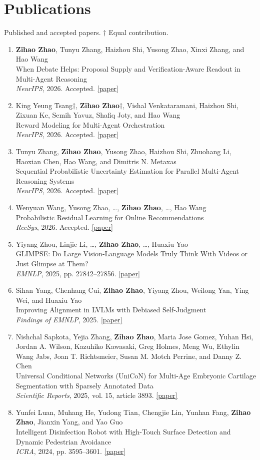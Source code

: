\documentclass[11pt,letterpaper]{article}
\newcommand{\pub}[3]{\item\begin{minipage}[t]{\linewidth}#1\\#2\\#3\end{minipage}}
\begin{document}
\section{Publications}
{\small\color{secondary}Published and accepted papers. $\dagger$ Equal contribution.}\par
\begin{enumerate}
\pub{\textbf{Zihao Zhao}, Tunyu Zhang, Haizhou Shi, Yusong Zhao, Xinxi Zhang, and Hao Wang}{When Debate Helps: Proposal Supply and Verification-Aware Readout in Multi-Agent Reasoning}{\emph{NeurIPS}, 2026. Accepted. \href{https://arxiv.org/abs/2610.04686v1}{[paper]}}
\pub{King Yeung Tsang$\dagger$, \textbf{Zihao Zhao}$\dagger$, Vishal Venkataramani, Haizhou Shi, Zixuan Ke, Semih Yavuz, Shafiq Joty, and Hao Wang}{Reward Modeling for Multi-Agent Orchestration}{\emph{NeurIPS}, 2026. Accepted. \href{https://arxiv.org/pdf/2606.13598}{[paper]}}
\pub{Tunyu Zhang, \textbf{Zihao Zhao}, Yusong Zhao, Haizhou Shi, Zhuohang Li, Haoxian Chen, Hao Wang, and Dimitris N. Metaxas}{Sequential Probabilistic Uncertainty Estimation for Parallel Multi-Agent Reasoning Systems}{\emph{NeurIPS}, 2026. Accepted. \href{https://openreview.net/forum?id=NRg4W8EzfT}{[paper]}}
\pub{Wenyuan Wang, Yusong Zhao, \ldots{}, \textbf{Zihao Zhao}, \ldots{}, Hao Wang}{Probabilistic Residual Learning for Online Recommendations}{\emph{RecSys}, 2026. Accepted. \href{https://arxiv.org/abs/2607.20863}{[paper]}}
\pub{Yiyang Zhou, Linjie Li, \ldots{}, \textbf{Zihao Zhao}, \ldots{}, Huaxiu Yao}{GLIMPSE: Do Large Vision-Language Models Truly Think With Videos or Just Glimpse at Them?}{\emph{EMNLP}, 2025, pp. 27842--27856. \href{https://aclanthology.org/2025.emnlp-main.1415.pdf}{[paper]}}
\pub{Sihan Yang, Chenhang Cui, \textbf{Zihao Zhao}, Yiyang Zhou, Weilong Yan, Ying Wei, and Huaxiu Yao}{Improving Alignment in LVLMs with Debiased Self-Judgment}{\emph{Findings of EMNLP}, 2025. \href{https://arxiv.org/abs/2508.20655}{[paper]}}
\pub{Nishchal Sapkota, Yejia Zhang, \textbf{Zihao Zhao}, Maria Jose Gomez, Yuhan Hsi, Jordan A. Wilson, Kazuhiko Kawasaki, Greg Holmes, Meng Wu, Ethylin Wang Jabs, Joan T. Richtsmeier, Susan M. Motch Perrine, and Danny Z. Chen}{Universal Conditional Networks (UniCoN) for Multi-Age Embryonic Cartilage Segmentation with Sparsely Annotated Data}{\emph{Scientific Reports}, 2025, vol. 15, article 3893. \href{https://doi.org/10.1038/s41598-025-87797-9}{[paper]}}
\pub{Yunfei Luan, Muhang He, Yudong Tian, Chengjie Lin, Yunhan Fang, \textbf{Zihao Zhao}, Jianxin Yang, and Yao Guo}{Intelligent Disinfection Robot with High-Touch Surface Detection and Dynamic Pedestrian Avoidance}{\emph{ICRA}, 2024, pp. 3595--3601. \href{https://doi.org/10.1109/ICRA57147.2024.10610836}{[paper]}}
\end{enumerate}
\end{document}
